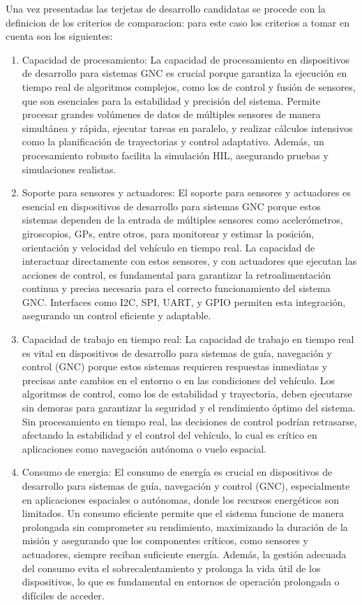 Una vez presentadas las terjetas de desarrollo candidatas se procede con la definicion de los criterios de comparacion: para este caso los criterios a tomar en cuenta son los siguientes:

\begin{enumerate}
    \item Capacidad de procesamiento: La capacidad de procesamiento en dispositivos de desarrollo para sistemas GNC es crucial porque garantiza la ejecución en tiempo real de algoritmos complejos, como los de control y fusión de sensores, que son esenciales para la estabilidad y precisión del sistema. Permite procesar grandes volúmenes de datos de múltiples sensores de manera simultánea y rápida, ejecutar tareas en paralelo, y realizar cálculos intensivos como la planificación de trayectorias y control adaptativo. Además, un procesamiento robusto facilita la simulación HIL, asegurando pruebas y simulaciones realistas.

    \item Soporte para sensores y actuadores: El soporte para sensores y actuadores es esencial en dispositivos de desarrollo para sistemas GNC porque estos sistemas dependen de la entrada de múltiples sensores como acelerómetros, giroscopios, GPs, entre otros, para monitorear y estimar la posición, orientación y velocidad del vehículo en tiempo real. La capacidad de interactuar directamente con estos sensores, y con actuadores que ejecutan las acciones de control, es fundamental para garantizar la retroalimentación continua y precisa necesaria para el correcto funcionamiento del sistema GNC. Interfaces como I2C, SPI, UART, y GPIO permiten esta integración, asegurando un control eficiente y adaptable.

    \item Capacidad de trabajo en tiempo real: La capacidad de trabajo en tiempo real es vital en dispositivos de desarrollo para sistemas de guía, navegación y control (GNC) porque estos sistemas requieren respuestas inmediatas y precisas ante cambios en el entorno o en las condiciones del vehículo. Los algoritmos de control, como los de estabilidad y trayectoria, deben ejecutarse sin demoras para garantizar la seguridad y el rendimiento óptimo del sistema. Sin procesamiento en tiempo real, las decisiones de control podrían retrasarse, afectando la estabilidad y el control del vehículo, lo cual es crítico en aplicaciones como navegación autónoma o vuelo espacial.

    \item Consumo de energia: El consumo de energía es crucial en dispositivos de desarrollo para sistemas de guía, navegación y control (GNC), especialmente en aplicaciones espaciales o autónomas, donde los recursos energéticos son limitados. Un consumo eficiente permite que el sistema funcione de manera prolongada sin comprometer su rendimiento, maximizando la duración de la misión y asegurando que los componentes críticos, como sensores y actuadores, siempre reciban suficiente energía. Además, la gestión adecuada del consumo evita el sobrecalentamiento y prolonga la vida útil de los dispositivos, lo que es fundamental en entornos de operación prolongada o difíciles de acceder.


\end{enumerate}
